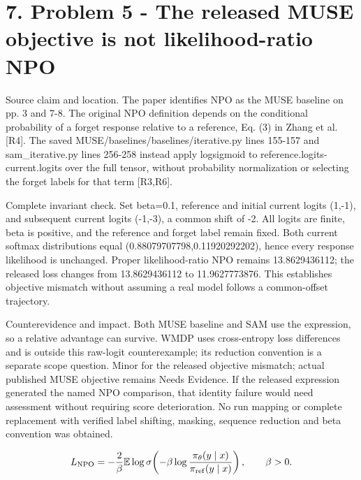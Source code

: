 \documentclass[10pt]{article}
\begin{document}
\section*{7. Problem 5 - The released MUSE objective is not likelihood-ratio NPO}
Source claim and location. The paper identifies NPO as the MUSE baseline on pp. 3 and 7-8. The original NPO definition depends on the conditional probability of a forget response relative to a reference, Eq. (3) in Zhang et al. [R4]. The saved MUSE/baselines/baselines/iterative.py lines 155-157 and sam\_iterative.py lines 256-258 instead apply logsigmoid to reference.logits-current.logits over the full tensor, without probability normalization or selecting the forget labels for that term [R3,R6].\par
Complete invariant check. Set beta=0.1, reference and initial current logits (1,-1), and subsequent current logits (-1,-3), a common shift of -2. All logits are finite, beta is positive, and the reference and forget label remain fixed. Both current softmax distributions equal (0.88079707798,0.11920292202), hence every response likelihood is unchanged. Proper likelihood-ratio NPO remains 13.8629436112; the released loss changes from 13.8629436112 to 11.9627773876. This establishes objective mismatch without assuming a real model follows a common-offset trajectory.\par
Counterevidence and impact. Both MUSE baseline and SAM use the expression, so a relative advantage can survive. WMDP uses cross-entropy loss differences and is outside this raw-logit counterexample; its reduction convention is a separate scope question. Minor for the released objective mismatch; actual published MUSE objective remains Needs Evidence. If the released expression generated the named NPO comparison, that identity failure would need assessment without requiring score deterioration. No run mapping or complete replacement with verified label shifting, masking, sequence reduction and beta convention was obtained.\par
\[L_{\rm NPO}=-\frac{2}{\beta}\mathbb E\log\sigma\!\left(-\beta\log\frac{\pi_\theta(y\mid x)}{\pi_{\rm ref}(y\mid x)}\right),\qquad \beta>0.\]\par
\end{document}
